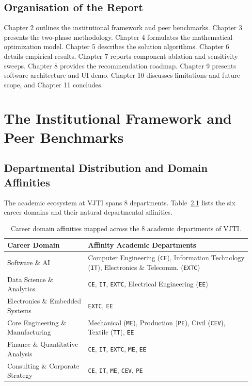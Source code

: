 \documentclass[11pt,a4paper,oneside]{report}
\begin{document}
\section{Organisation of the Report}
Chapter 2 outlines the institutional framework and peer benchmarks. Chapter 3 presents the two-phase methodology. Chapter 4 formulates the mathematical optimization model. Chapter 5 describes the solution algorithms. Chapter 6 details empirical results. Chapter 7 reports component ablation and sensitivity sweeps. Chapter 8 provides the recommendation roadmap. Chapter 9 presents software architecture and UI demo. Chapter 10 discusses limitations and future scope, and Chapter 11 concludes.

\chapter{The Institutional Framework and Peer Benchmarks}

\section{Departmental Distribution and Domain Affinities}
The academic ecosystem at VJTI spans 8 departments. Table~\ref{tab:domain_affinities} lists the six career domains and their natural departmental affinities.

\begin{table}[htbp]
\centering
\caption{Career domain affinities mapped across the 8 academic departments of VJTI.}
\label{tab:domain_affinities}
\begin{tabularx}{\textwidth}{lX}
\toprule
\textbf{Career Domain} & \textbf{Affinity Academic Departments} \\
\midrule
Software \& AI & Computer Engineering (\texttt{CE}), Information Technology (\texttt{IT}), Electronics \& Telecomm. (\texttt{EXTC}) \\
Data Science \& Analytics & \texttt{CE}, \texttt{IT}, \texttt{EXTC}, Electrical Engineering (\texttt{EE}) \\
Electronics \& Embedded Systems & \texttt{EXTC}, \texttt{EE} \\
Core Engineering \& Manufacturing & Mechanical (\texttt{ME}), Production (\texttt{PE}), Civil (\texttt{CEV}), Textile (\texttt{TT}), \texttt{EE} \\
Finance \& Quantitative Analysis & \texttt{CE}, \texttt{IT}, \texttt{EXTC}, \texttt{ME}, \texttt{EE} \\
Consulting \& Corporate Strategy & \texttt{CE}, \texttt{IT}, \texttt{ME}, \texttt{CEV}, \texttt{PE} \\
\bottomrule
\end{tabularx}
\end{table}
\end{document}

